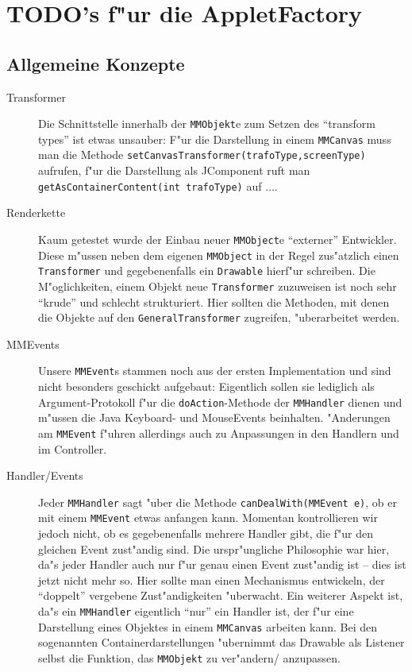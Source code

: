 \documentclass[a4paper,12pt]{article}
\newcommand{\code}[1]{\texttt{#1}}
\begin{document}
\section{TODO's f"ur die AppletFactory}

\subsection{Allgemeine Konzepte}

\begin{description}

\item [Transformer]
Die Schnittstelle innerhalb der \code{MMObjekt}e zum Setzen des ``transform
types'' ist etwas unsauber: F"ur die Darstellung in einem \code{MMCanvas}
muss man die Methode \code{setCanvasTransformer(trafoType,screenType)}
aufrufen, f"ur die Darstellung als JComponent ruft man
\code{getAsContainerContent(int trafoType)} auf $\ldots$.

\item [Renderkette]
Kaum getestet wurde der Einbau neuer \code{MMObject}e ``externer''
Entwickler. Diese m"ussen neben dem eigenen \code{MMObject} in der Regel
zus"atzlich einen \code{Transformer} und gegebenenfalls ein \code{Drawable}
hierf"ur schreiben.
Die M"oglichkeiten, einem Objekt neue \code{Transformer} zuzuweisen ist noch
sehr ``krude'' und schlecht strukturiert. Hier sollten die Methoden, mit denen
die Objekte auf den \code{GeneralTransformer} zugreifen, "uberarbeitet werden.

\item [MMEvents]
Unsere \code{MMEvent}s stammen noch aus der ersten Implementation und sind
nicht besonders geschickt aufgebaut: Eigentlich sollen sie lediglich als
Argument-Protokoll f"ur die \code{doAction}-Methode der \code{MMHandler}
dienen und m"ussen die Java Keyboard- und MouseEvents beinhalten. "Anderungen
am \code{MMEvent} f"uhren allerdings auch zu Anpassungen in den Handlern und
im Controller.

\item [Handler/Events]
Jeder \code{MMHandler} sagt "uber die Methode \code{canDealWith(MMEvent e)},
ob er mit einem \code{MMEvent} etwas anfangen kann. Momentan kontrollieren wir
jedoch nicht, ob es gegebenenfalls mehrere Handler gibt, die f"ur den gleichen
Event zust"andig sind.
Die urspr"ungliche Philosophie war hier, da"s jeder Handler auch nur f"ur
genau einen Event zust"andig ist -- dies ist jetzt nicht mehr so. Hier sollte
man einen Mechanismus entwickeln, der ``doppelt'' vergebene Zust"andigkeiten
"uberwacht.
Ein weiterer Aspekt ist, da"s ein \code{MMHandler} eigentlich ``nur'' ein
Handler ist, der f"ur eine Darstellung eines Objektes in einem \code{MMCanvas}
arbeiten kann. Bei den sogenannten Containerdarstellungen "ubernimmt das
Drawable als Listener selbst die Funktion, das \code{MMObjekt} zu ver"andern/
anzupassen.


\end{description}
\end{document}
